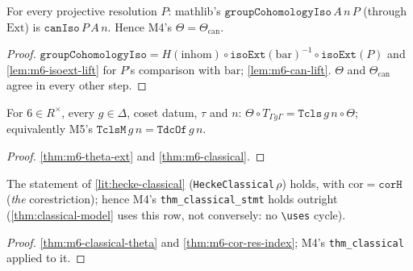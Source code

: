 \begin{theorem}[The $\mathrm{Ext}$-built comparison is the canonical one; M4's $\Theta=\Theta_{\mathrm{can}}$]\label{thm:m6-theta-ext}
  \leanok
  For every projective resolution $P$: mathlib's $\texttt{groupCohomologyIso}\,A\,n\,P$ (through $\mathrm{Ext}$) is
  $\texttt{canIso}\,P\,A\,n$. Hence M4's $\Theta=\Theta_{\mathrm{can}}$.
\end{theorem}
\begin{proof}
  \leanok
  $\texttt{groupCohomologyIso}=H(\mathrm{inhom})\circ\texttt{isoExt}(\mathrm{bar})^{-1}\circ\texttt{isoExt}(P)$ and
  \ref{lem:m6-isoext-lift} for $P$'s comparison with $\mathrm{bar}$; \ref{lem:m6-can-lift}. $\Theta$ and $\Theta_{\mathrm{can}}$ agree
  in every other step.
\end{proof}

\begin{theorem}\label{thm:m6-classical-theta}
  \leanok
  For $6\in R^\times$, every $g\in\Delta$, coset datum, $\tau$ and $n$: $\Theta\circ T_{\Gamma g\Gamma}=\texttt{Tcls}\,g\,n\circ\Theta$;
  equivalently M5's $\texttt{TclsM}\,g\,n=\texttt{TdcOf}\,g\,n$.
\end{theorem}
\begin{proof}
  \leanok
  \ref{thm:m6-theta-ext} and \ref{thm:m6-classical}.
\end{proof}

\begin{theorem}\label{thm:m6-hcl}
  \leanok
  The statement of \ref{lit:hecke-classical} (\texttt{HeckeClassical}\,$\rho$) holds, with $\mathrm{cor}=\texttt{corH}$ (\emph{the}
  corestriction); hence M4's \texttt{thm\_classical\_stmt} holds outright (\ref{thm:classical-model} uses this row, not
  conversely: no \texttt{\textbackslash uses} cycle).
\end{theorem}
\begin{proof}
  \leanok
  \ref{thm:m6-classical-theta} and \ref{thm:m6-cor-res-index}; M4's \texttt{thm\_classical} applied to it.
\end{proof}

